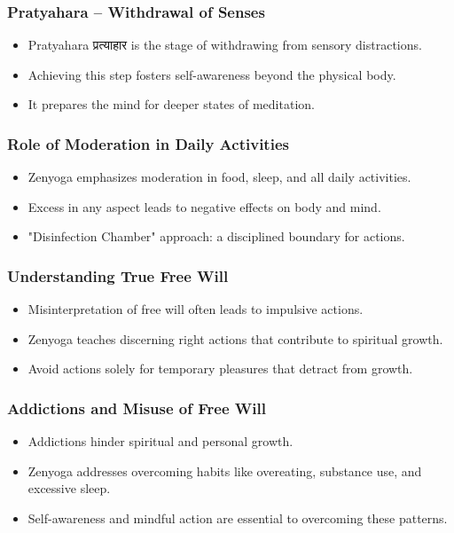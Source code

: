 \begin{frame}[fragile]\frametitle{Pratyahara – Withdrawal of Senses}
    \begin{itemize}
        \item Pratyahara प्रत्याहार is the stage of withdrawing from sensory distractions.
        \item Achieving this step fosters self-awareness beyond the physical body.
        \item It prepares the mind for deeper states of meditation.
    \end{itemize}
\end{frame}

\begin{frame}[fragile]\frametitle{Role of Moderation in Daily Activities}
    \begin{itemize}
        \item Zenyoga emphasizes moderation in food, sleep, and all daily activities.
        \item Excess in any aspect leads to negative effects on body and mind.
        \item "Disinfection Chamber" approach: a disciplined boundary for actions.
    \end{itemize}
\end{frame}

\begin{frame}[fragile]\frametitle{Understanding True Free Will}
    \begin{itemize}
        \item Misinterpretation of free will often leads to impulsive actions.
        \item Zenyoga teaches discerning right actions that contribute to spiritual growth.
        \item Avoid actions solely for temporary pleasures that detract from growth.
    \end{itemize}
\end{frame}

\begin{frame}[fragile]\frametitle{Addictions and Misuse of Free Will}
    \begin{itemize}
        \item Addictions hinder spiritual and personal growth.
        \item Zenyoga addresses overcoming habits like overeating, substance use, and excessive sleep.
        \item Self-awareness and mindful action are essential to overcoming these patterns.
    \end{itemize}
\end{frame}

